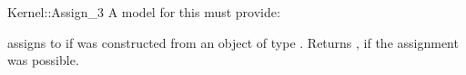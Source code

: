 \begin{ccRefFunctionObjectConcept}{Kernel::Assign_3}
A model for this must provide:


{assigns  to  if 
was constructed from an object of type .
Returns , if the assignment was possible.}

\ccIsModel{}

\ccSeeAlso
{}

\end{ccRefFunctionObjectConcept}
